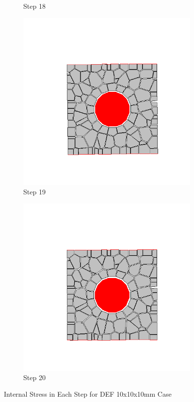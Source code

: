 \begin{figure}[ht!]
\begin{subfigure}{.25\textwidth}
      \caption{Step 18}
      \end{subfigure}%
      \begin{subfigure}{.25\textwidth}
        \centering
        \includegraphics[width=1.0\linewidth]{Files/Small_DEF/CR/DEP5-STEP(019).png}
      \caption{Step 19}
      \end{subfigure}%
      \begin{subfigure}{.25\textwidth}
        \centering
        \includegraphics[width=1.0\linewidth]{Files/Small_DEF/CR/DEP5-STEP(020).png}
      \caption{Step 20}
      \end{subfigure}

  \caption{Internal Stress in Each Step for DEF 10x10x10mm Case}
  \label{fig:DEF_Small_DEF_CR}
  \end{figure}

